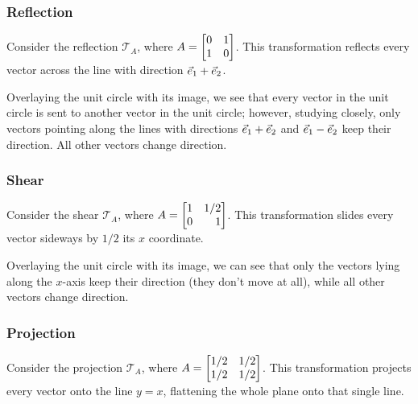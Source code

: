 \begin{center}
\end{center}

\subsubsection*{Reflection}
Consider the reflection $\mathcal{T}_{A}$, where $A=\mat{0 & 1\\ 1 & 0}$. This transformation reflects every vector across the
line with direction ${\vec e_1} + {\vec e_2}$.

\begin{center}
\end{center}

Overlaying the unit circle with its image, we see that every vector in the unit circle is sent to another vector in the unit circle; however, studying closely,
only vectors pointing along the lines with directions ${\vec e_1}+{\vec e_2}$ and ${\vec e_1} - {\vec e_2}$ keep their direction.
All other vectors change direction.

\begin{center}
\end{center}

\subsubsection*{Shear}
Consider the shear $\mathcal{T}_{A}$, where $A=\mat{1 & 1/2\\ 0 & 1}$. This transformation slides every vector sideways by 
$1/2$ its $x$ coordinate.

\begin{center}
\end{center}

Overlaying the unit circle with its image, we can see that only the vectors lying along the $x$-axis keep their direction (they don't move at all),
while all other vectors change direction.

\begin{center}
\end{center}

\subsubsection*{Projection}
Consider the projection $\mathcal{T}_{A}$, where $A=\mat{1/2 & 1/2\\ 1/2 & 1/2}$. This transformation projects every vector onto
the line $y=x$, flattening the whole plane onto that single line.

